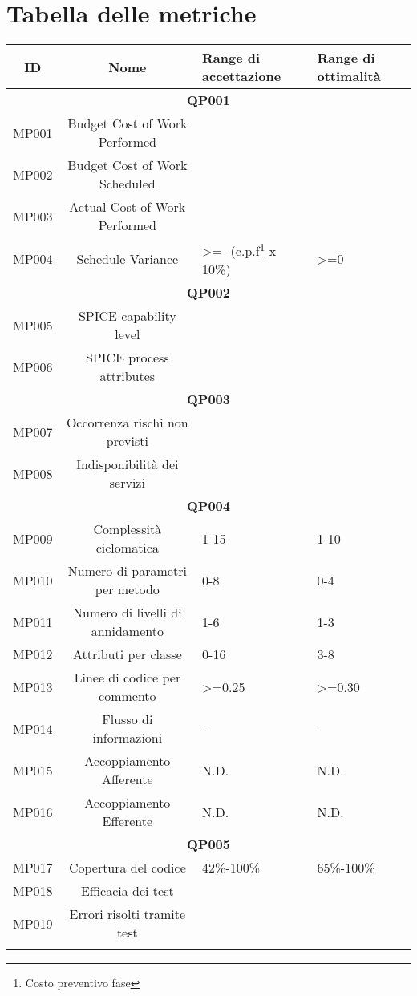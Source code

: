 \section{Tabella delle metriche}
\begin{center}
\begin{tabularx}{\textwidth}{|c|c|X|X|}
	\hline 
	\textbf{ID} & \textbf{Nome} & \textbf{Range di accettazione}  & \textbf{Range di ottimalità}  \\ 
	\hline
	\multicolumn{4}{|c|}{\textbf{QP001}} \\
	\hline
	MP001 & Budget Cost of Work Performed &  &  \\ 
	\hline 
	MP002 & Budget Cost of Work Scheduled &  &  \\ 
	\hline 
	MP003 & Actual Cost of Work Performed &  &  \\ 
	\hline 
	MP004 & Schedule Variance & >= -(c.p.f\footnote{Costo preventivo fase} x 10\%) & >=0 \\ 
	\hline
	\multicolumn{4}{|c|}{\textbf{QP002}} \\
	\hline
	MP005 & SPICE capability level &  &  \\ 
	\hline 
	MP006 & SPICE process attributes &  &  \\ 
	\hline
	\multicolumn{4}{|c|}{\textbf{QP003}} \\
	\hline
	MP007 & Occorrenza rischi non previsti &  &  \\ 
	\hline 
	MP008 & Indisponibilità dei servizi &  &  \\ 
	\hline
	\multicolumn{4}{|c|}{\textbf{QP004}} \\
	\hline
	MP009 & Complessità ciclomatica & 1-15 & 1-10 \\ 
	\hline 
	MP010 & Numero di parametri per metodo & 0-8 & 0-4 \\ 
	\hline 
	MP011 & Numero di livelli di annidamento & 1-6 & 1-3 \\ 
	\hline 
	MP012 & Attributi per classe & 0-16 & 3-8 \\ 
	\hline 
	MP013 & Linee di codice per commento & >=0.25 & >=0.30 \\ 
	\hline
	MP014 & Flusso di informazioni & - & - \\ 
	\hline 
	MP015 & Accoppiamento Afferente & N.D. & N.D. \\ 
	\hline 
	MP016 & Accoppiamento Efferente & N.D. & N.D. \\ 
	\hline
	\multicolumn{4}{|c|}{\textbf{QP005}} \\
	\hline
	MP017 & Copertura del codice & 42\%-100\% & 65\%-100\% \\ 
	\hline 
	MP018 & Efficacia dei test &  &  \\ 
	\hline 
	MP019 & Errori risolti tramite test &  &  \\ 
	\hline
	\caption{Tabella delle metriche dei processi}
\end{tabularx}
\end{center}